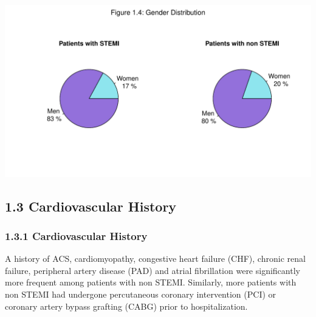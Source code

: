 \documentclass[
]{article}
\begin{document}
~

~

\includegraphics{‏‏ACSIS_2024_v1_with_trend_pdf_files/figure-latex/unnamed-chunk-16-1.pdf}

\pagebreak

\subsection{1.3 Cardiovascular History}\label{cardiovascular-history}

\subsubsection{1.3.1 Cardiovascular
History}\label{cardiovascular-history-1}

A history of ACS, cardiomyopathy, congestive heart failure (CHF),
chronic renal failure, peripheral artery disease (PAD) and atrial
fibrillation were significantly more frequent among patients with non
STEMI. Similarly, more patients with non STEMI had undergone
percutaneous coronary intervention (PCI) or coronary artery bypass
grafting (CABG) prior to hospitalization.

~
\end{document}
